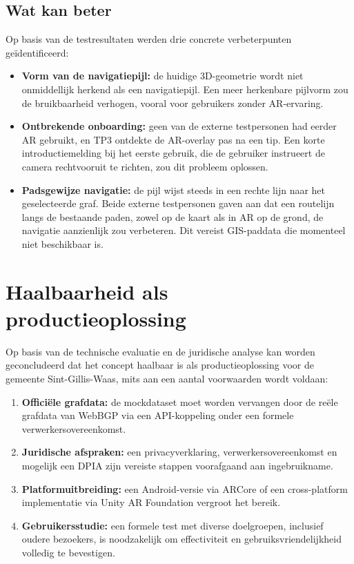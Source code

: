 \subsection{Wat kan beter}

Op basis van de testresultaten werden drie concrete verbeterpunten geïdentificeerd:

\begin{itemize}
    \item \textbf{Vorm van de navigatiepijl:} de huidige 3D-geometrie wordt
    niet onmiddellijk herkend als een navigatiepijl. Een meer herkenbare
    pijlvorm zou de bruikbaarheid verhogen, vooral voor gebruikers zonder
    AR-ervaring.
    
    \item \textbf{Ontbrekende onboarding:} geen van de externe testpersonen
    had eerder AR gebruikt, en TP3 ontdekte de AR-overlay pas na een tip.
    Een korte introductiemelding bij het eerste gebruik, die de gebruiker
    instrueert de camera rechtvooruit te richten, zou dit probleem oplossen.
    
    \item \textbf{Padsgewijze navigatie:} de pijl wijst steeds in een rechte
    lijn naar het geselecteerde graf. Beide externe testpersonen gaven aan dat
    een routelijn langs de bestaande paden, zowel op de kaart als in AR op de
    grond, de navigatie aanzienlijk zou verbeteren. Dit vereist GIS-paddata
    die momenteel niet beschikbaar is.
\end{itemize}

\section{Haalbaarheid als productieoplossing}

Op basis van de technische evaluatie en de juridische analyse kan worden
geconcludeerd dat het concept haalbaar is als productieoplossing voor de gemeente
Sint-Gillis-Waas, mits aan een aantal voorwaarden wordt voldaan:

\begin{enumerate}
    \item \textbf{Officiële grafdata:} de mockdataset moet worden vervangen door
    de reële grafdata van WebBGP via een API-koppeling onder een formele
    verwerkersovereenkomst.
    \item \textbf{Juridische afspraken:} een privacyverklaring, verwerkersovereenkomst
    en mogelijk een DPIA zijn vereiste stappen voorafgaand aan ingebruikname.
    \item \textbf{Platformuitbreiding:} een Android-versie via ARCore of een
    cross-platform implementatie via Unity AR Foundation vergroot het bereik.
    \item \textbf{Gebruikersstudie:} een formele test met diverse doelgroepen,
    inclusief oudere bezoekers, is noodzakelijk om effectiviteit en
    gebruiksvriendelijkheid volledig te bevestigen.
\end{enumerate}

